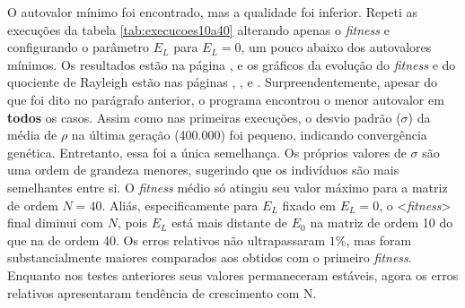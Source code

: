 	O autovalor mínimo foi encontrado, mas a qualidade foi inferior. Repeti as execuções da tabela \ref{tab:execucoes10a40} alterando apenas o \textit{fitness} e configurando o parâmetro $E_L$ para $E_L = 0$, um pouco abaixo dos autovalores mínimos. Os resultados estão na página \pageref{tab:execucoesNovoFitness}, e os gráficos da evolução do \textit{fitness} e do quociente de Rayleigh estão nas páginas \pageref{fig:execucoes_N10_EL}, \pageref{fig:execucoes_N20_EL}, \pageref{fig:execucoes_N30_EL} e \pageref{fig:execucoes_N40_EL}. Surpreendentemente, apesar do que foi dito no parágrafo anterior, o programa encontrou o menor autovalor em \textbf{todos} os casos. Assim como nas primeiras execuções, o desvio padrão ($\sigma$) da média de $\rho$ na última geração (400.000) foi pequeno, indicando convergência genética. Entretanto, essa foi a única semelhança. Os próprios valores de $\sigma$ são uma ordem de grandeza menores, sugerindo que os indivíduos são mais semelhantes entre si. O \textit{fitness} médio só atingiu seu valor máximo para a matriz de ordem $N = 40$. Aliás, especificamente para $E_L$ fixado em $E_L = 0$, o <\textit{fitness}> final diminui com $N$, pois $E_L$ está mais distante de $E_0$ na matriz de ordem 10 do que na de ordem 40. Os erros relativos não ultrapassaram $1\%$, mas foram substancialmente maiores comparados aos obtidos com o primeiro \textit{fitness}. Enquanto nos testes anteriores seus valores permaneceram estáveis, agora os erros relativos apresentaram tendência de crescimento com N.
	
